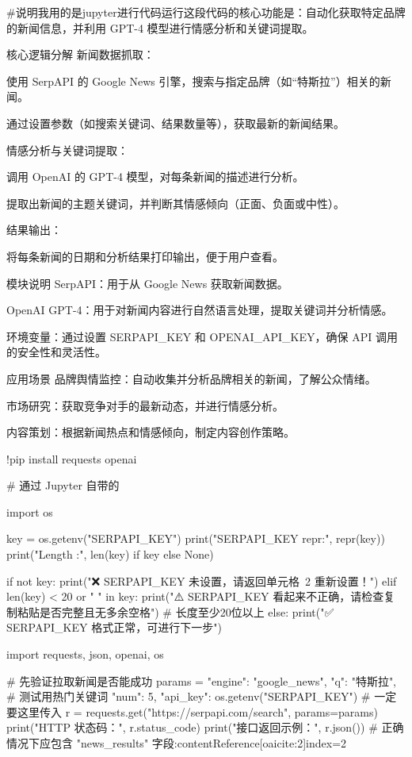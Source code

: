 #说明我用的是jupyter进行代码运行这段代码的核心功能是：自动化获取特定品牌的新闻信息，并利用 GPT-4 模型进行情感分析和关键词提取。

核心逻辑分解
新闻数据抓取：

使用 SerpAPI 的 Google News 引擎，搜索与指定品牌（如“特斯拉”）相关的新闻。

通过设置参数（如搜索关键词、结果数量等），获取最新的新闻结果。

情感分析与关键词提取：

调用 OpenAI 的 GPT-4 模型，对每条新闻的描述进行分析。

提取出新闻的主题关键词，并判断其情感倾向（正面、负面或中性）。

结果输出：

将每条新闻的日期和分析结果打印输出，便于用户查看。


模块说明
SerpAPI：用于从 Google News 获取新闻数据。

OpenAI GPT-4：用于对新闻内容进行自然语言处理，提取关键词并分析情感。

环境变量：通过设置 SERPAPI_KEY 和 OPENAI_API_KEY，确保 API 调用的安全性和灵活性。

应用场景
品牌舆情监控：自动收集并分析品牌相关的新闻，了解公众情绪。

市场研究：获取竞争对手的最新动态，并进行情感分析。

内容策划：根据新闻热点和情感倾向，制定内容创作策略。





!pip install requests openai




# 通过 Jupyter 自带的 %




import os

key = os.getenv("SERPAPI_KEY")
print("SERPAPI_KEY repr:", repr(key))
print("Length       :", len(key) if key else None)

if not key:
    print("❌ SERPAPI_KEY 未设置，请返回单元格 2 重新设置！")
elif len(key) < 20 or " " in key:
    print("⚠️ SERPAPI_KEY 看起来不正确，请检查复制粘贴是否完整且无多余空格")  # 长度至少20位以上
else:
    print("✅ SERPAPI_KEY 格式正常，可进行下一步")






import requests, json, openai, os

# 先验证拉取新闻是否能成功
params = {
    "engine":  "google_news",
    "q":       "特斯拉",                   # 测试用热门关键词
    "num":     5,
    "api_key": os.getenv("SERPAPI_KEY")    # 一定要这里传入
}
r = requests.get("https://serpapi.com/search", params=params)
print("HTTP 状态码：", r.status_code)
print("接口返回示例：", r.json())            # 正确情况下应包含 "news_results" 字段:contentReference[oaicite:2]{index=2}

